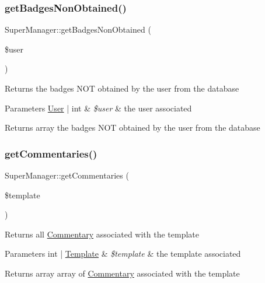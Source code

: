 \subsubsection{\texorpdfstring{get\+Badges\+Non\+Obtained()}{getBadgesNonObtained()}}
{\footnotesize\ttfamily Super\+Manager\+::get\+Badges\+Non\+Obtained (\begin{DoxyParamCaption}\item[{}]{\$user }\end{DoxyParamCaption})}

Returns the badges N\+OT obtained by the user from the database 
\begin{DoxyParams}[1]{Parameters}
\hyperlink{classUser}{User} | int & {\em \$user} & the user associated \\
\hline
\end{DoxyParams}
\begin{DoxyReturn}{Returns}
array the badges N\+OT obtained by the user from the database 
\end{DoxyReturn}
\mbox{\label{classSuperManager_a71ce25db0a1b54bb4daee8ef9db22f0d}} 
\subsubsection{\texorpdfstring{get\+Commentaries()}{getCommentaries()}}
{\footnotesize\ttfamily Super\+Manager\+::get\+Commentaries (\begin{DoxyParamCaption}\item[{}]{\$template }\end{DoxyParamCaption})}

Returns all \hyperlink{classCommentary}{Commentary} associated with the template 
\begin{DoxyParams}[1]{Parameters}
int | \hyperlink{classTemplate}{Template} & {\em \$template} & the template associated \\
\hline
\end{DoxyParams}
\begin{DoxyReturn}{Returns}
array array of \hyperlink{classCommentary}{Commentary} associated with the template 
\end{DoxyReturn}
\mbox{\label{classSuperManager_a8ca540bb9bc9a9afc4914d93288a4fb3}} 
